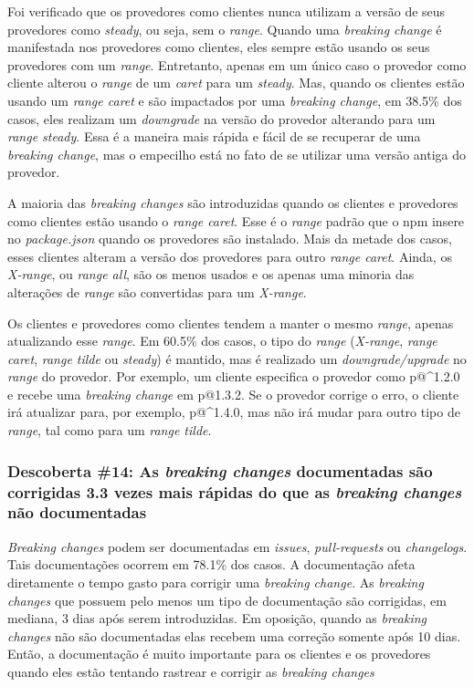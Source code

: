Foi verificado que os provedores como clientes nunca utilizam a versão de seus provedores como \textit{steady}, ou seja, sem o \textit{range}. Quando uma \textit{breaking change} é manifestada nos provedores como clientes, eles sempre estão usando os seus provedores com um \textit{range}. Entretanto, apenas em um único caso o provedor como cliente alterou o \textit{range} de um \textit{caret} para um \textit{steady}. Mas, quando os clientes estão usando um \textit{range caret} e são impactados por uma \textit{breaking change}, em 38.5\% dos casos, eles realizam um \textit{downgrade} na versão do provedor alterando para um \textit{range steady}. Essa é a maneira mais rápida e fácil de se recuperar de uma \textit{breaking change}, mas o empecilho está no fato de se utilizar uma versão antiga do provedor.

A maioria das \textit{breaking changes} são introduzidas quando os clientes e provedores como clientes estão usando o \textit{range caret}. Esse é o \textit{range} padrão que o \textsf{npm} insere no \textit{package.json} quando os provedores são instalado. Mais da metade dos casos, esses clientes alteram a versão dos provedores para outro \textit{range caret}. Ainda, os \textit{X-range}, ou \textit{range all}, são os menos usados e os apenas uma minoria das alterações de \textit{range} são convertidas para um \textit{X-range}.

Os clientes e provedores como clientes tendem a manter o mesmo \textit{range}, apenas atualizando esse \textit{range}. Em 60.5\% dos casos, o tipo do \textit{range} (\textit{X-range}, \textit{range caret}, \textit{range tilde} ou \textit{steady}) é mantido, mas é realizado um \textit{downgrade/upgrade} no \textit{range} do provedor. Por exemplo, um cliente especifica o provedor como \textsf{p@\textasciicircum1.2.0} e recebe uma \textit{breaking change} em \textsf{p@1.3.2}. Se o provedor corrige o erro, o cliente irá atualizar para, por exemplo, \textsf{p@\textasciicircum1.4.0}, mas não irá mudar para outro tipo de \textit{range}, tal como para um \textit{range tilde}.

\subsubsection{Descoberta \#14: As \textit{breaking changes} documentadas são corrigidas 3.3 vezes mais rápidas do que as \textit{breaking changes} não documentadas}

\textit{Breaking changes} podem ser documentadas em \textit{issues}, \textit{pull-requests} ou \textit{changelogs}. Tais documentações ocorrem em 78.1\% dos casos. A documentação afeta diretamente o tempo gasto para corrigir uma \textit{breaking change}. As \textit{breaking changes} que possuem pelo menos um tipo de documentação são corrigidas, em mediana, 3 dias após serem introduzidas. Em oposição, quando as \textit{breaking changes} não são documentadas elas recebem uma correção somente após 10 dias. Então, a documentação é muito importante para os clientes e os provedores quando eles estão tentando rastrear e corrigir as \textit{breaking changes}

